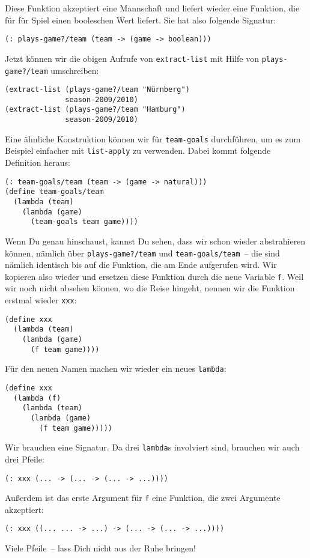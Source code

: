 Diese Funktion akzeptiert eine Mannschaft und liefert wieder eine
Funktion, die für für Spiel einen booleschen Wert liefert.  Sie hat
also folgende Signatur:
%
\begin{lstlisting}
(: plays-game?/team (team -> (game -> boolean)))
\end{lstlisting}
%
Jetzt können wir die obigen Aufrufe von \lstinline{extract-list} mit
Hilfe von \lstinline{plays-game?/team} umschreiben:
%
\begin{lstlisting}
(extract-list (plays-game?/team "Nürnberg")
              season-2009/2010)
(extract-list (plays-game?/team "Hamburg")
              season-2009/2010)
\end{lstlisting}
%
Eine ähnliche Konstruktion können wir für \lstinline{team-goals}
durchführen, um es zum Beispiel einfacher mit \lstinline{list-apply}
zu verwenden.  Dabei kommt folgende Definition heraus:
%
\begin{lstlisting}
(: team-goals/team (team -> (game -> natural)))
(define team-goals/team
  (lambda (team)
    (lambda (game)
      (team-goals team game))))
\end{lstlisting}
%
Wenn Du genau hinschaust, kannst Du sehen, dass wir schon wieder
abstrahieren können, nämlich über \lstinline{plays-game?/team} und
\lstinline{team-goals/team}~-- die sind nämlich identisch bis auf die Funktion,
die am Ende aufgerufen wird.  Wir kopieren also wieder und ersetzen
diese Funktion durch die neue Variable \lstinline{f}.  Weil wir noch
nicht absehen können, wo die Reise hingeht, nennen wir die Funktion
erstmal wieder \lstinline{xxx}:
%
\begin{lstlisting}
(define xxx
  (lambda (team)
    (lambda (game)
      (f team game))))
\end{lstlisting}
%
Für den neuen Namen machen wir wieder ein neues \lstinline{lambda}:
%
\begin{lstlisting}
(define xxx
  (lambda (f)
    (lambda (team)
      (lambda (game)
        (f team game)))))
\end{lstlisting}
%
Wir brauchen eine Signatur.  Da drei \lstinline{lambda}s involviert
sind, brauchen wir auch drei Pfeile:
%
\begin{lstlisting}
(: xxx (... -> (... -> (... -> ...))))
\end{lstlisting}
%
Außerdem ist das erste Argument für \lstinline{f} eine Funktion, die
zwei Argumente akzeptiert:
%
\begin{lstlisting}
(: xxx ((... ... -> ...) -> (... -> (... -> ...))))
\end{lstlisting}
%
Viele Pfeile~-- lass Dich nicht aus der Ruhe bringen!

